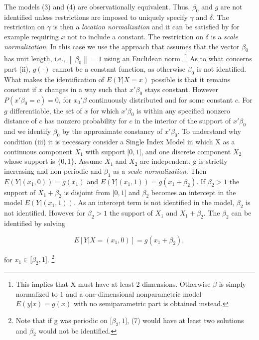 \documentclass[a4paper]{article}
\newcommand{\norm}[1]{\left\lVert#1\right\rVert}
\begin{document}
The models (3) and (4) are observationally equivalent. Thus, $\beta_0$ and $g$ are not identified unless restrictions are imposed to uniquely specify $\gamma$ and $\delta$. The restriction on $\gamma$ is then a \textit{location normalization} and it can be satisfied by for example requiring $x$ not to include a constant. The restriction on $\delta$ is a \textit{scale normalization}. In this case we use the approach that assumes that the vector $\beta_0$ has unit length, i.e., $\norm{ \beta_0 } = 1$ using an Euclidean norm. \footnote{This implies that X must have at least 2 dimensions. Otherwise $\beta$ is simply normalized to 1 and a one-dimensional nonparametric model $E(y|x) = g(x)$ with no semiparametric part is obtained instead.} %
As to what concerns part (ii), $g(\cdot)$ cannot be a constant function, as otherwise $\beta_0$ is not identified. What makes the identification of $E(Y|X = x)$ possible is that it remains constant if $x$ changes in a way such that $x'\beta_0$ stays constant. However $P(x'\beta_0 = c)=0$, for $x_0'\beta$ continuously distributed and for some constant $c$. For $g$ differentiable, the set of $x$ for which $x'\beta_0$ is within any specified nonzero distance of $c$ has nonzero probability for $c$ in the interior of the support of $x'\beta_0$ and we identify $\beta_0$ by the approximate constancy of $x'\beta_0$.
To understand why condition (iii) it is necessary consider a Single Index Model in which X as a continuous component $X_1$ with support $\big[0,1\big]$, and one discrete component $X_2$ whose support is $\{0,1\}$. Assume $X_1$ and $X_2$ are independent, g is strictly increasing and non periodic and $\beta_1$ as a \textit{scale normalization}. Then $E(Y|(x_1,0)) = g(x_1)$ and $E(Y|(x_1,1)) = g(x_1 + \beta_2)$. If $\beta_2 > 1$ the support of $ X_1 + \beta_2$ is disjoint from $\big[0,1\big]$ and $\beta_2$ becomes an intercept in the model $E(Y|(x_1,1))$. As an intercept term is not identified in the model, $\beta_2$ is not identified. However for $\beta_2 >1$ the support of $X_1$ and $X_1 + \beta_2$. The $\beta_2$ can be identified by solving

\begin{equation}
E[Y| X = (x_1,0)] = g( x_1 + \beta_2),
\end{equation}

for $x_1 \in \big[\beta_2,1\big]$. \footnote{Note that if g was periodic on $\big[\beta_2,1\big]$, (7) would have at least two solutions and $\beta_2$ would not be identified.}
\end{document}
